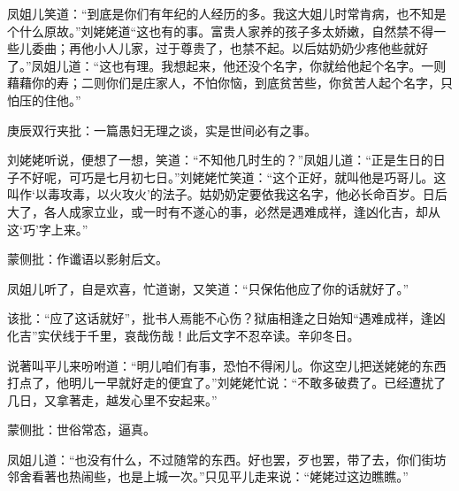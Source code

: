 \begin{parag}


    凤姐儿笑道：“到底是你们有年纪的人经历的多。我这大姐儿时常肯病，也不知是个什么原故。”刘姥姥道“这也有的事。富贵人家养的孩子多太娇嫩，自然禁不得一些儿委曲；再他小人儿家，过于尊贵了，也禁不起。以后姑奶奶少疼他些就好了。”凤姐儿道：“这也有理。我想起来，他还没个名字，你就给他起个名字。一则藉藉你的寿；二则你们是庄家人，不怕你恼，到底贫苦些，你贫苦人起个名字，只怕压的住他。”\begin{note}庚辰双行夹批：一篇愚妇无理之谈，实是世间必有之事。\end{note}刘姥姥听说，便想了一想，笑道：“不知他几时生的？”凤姐儿道：“正是生日的日子不好呢，可巧是七月初七日。”刘姥姥忙笑道：“这个正好，就叫他是巧哥儿。这叫作‘以毒攻毒，以火攻火’的法子。姑奶奶定要依我这名字，他必长命百岁。日后大了，各人成家立业，或一时有不遂心的事，必然是遇难成祥，逢凶化吉，却从这‘巧’字上来。”\begin{note}蒙侧批：作谶语以影射后文。\end{note}
\end{parag}


\begin{parag}


    凤姐儿听了，自是欢喜，忙道谢，又笑道：“只保佑他应了你的话就好了。”\begin{note} 该批：“应了这话就好”，批书人焉能不心伤？狱庙相逢之日始知“遇难成祥，逢凶化吉”实伏线于千里，哀哉伤哉！此后文字不忍卒读。辛卯冬日。\end{note}说著叫平儿来吩咐道：“明儿咱们有事，恐怕不得闲儿。你这空儿把送姥姥的东西打点了，他明儿一早就好走的便宜了。”刘姥姥忙说：“不敢多破费了。已经遭扰了几日，又拿著走，越发心里不安起来。”\begin{note}蒙侧批：世俗常态，逼真。\end{note}凤姐儿道：“也没有什么，不过随常的东西。好也罢，歹也罢，带了去，你们街坊邻舍看著也热闹些，也是上城一次。”只见平儿走来说：“姥姥过这边瞧瞧。”
\end{parag}



